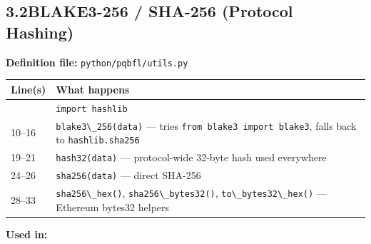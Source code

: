 \documentclass[11pt,a4paper]{article}
\newcommand{\code}[1]{\lstinline[basicstyle=\ttfamily\small]!#1!}
\begin{document}
\subsection{3.2\quad BLAKE3-256 / SHA-256 (Protocol Hashing)}

\textbf{Definition file:} \code{python/pqbfl/utils.py}

\begin{longtable}{L{2.2cm} L{11.5cm}}
\toprule
\textbf{Line(s)} & \textbf{What happens} \\
\midrule
\endhead
\bottomrule
{}       & \code{import hashlib} \\
10--16  & \code{blake3\_256(data)} --- tries \code{from blake3 import blake3}, falls back to \code{hashlib.sha256} \\
19--21  & \code{hash32(data)} --- protocol-wide 32-byte hash used everywhere \\
24--26  & \code{sha256(data)} --- direct SHA-256 \\
28--33  & \code{sha256\_hex()}, \code{sha256\_bytes32()}, \code{to\_bytes32\_hex()} --- Ethereum bytes32 helpers \\
\end{longtable}

\textbf{Used in:}
\end{document}
